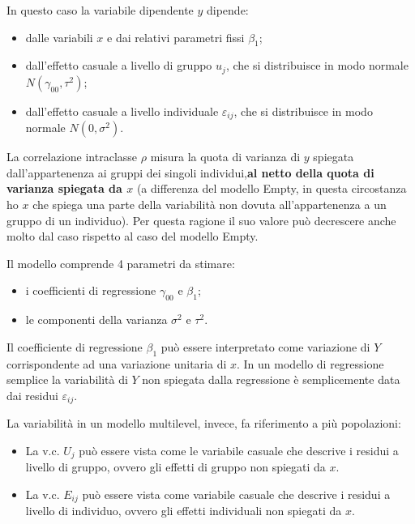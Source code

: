 \documentclass[a4page, 11pt]{article} %
\begin{document}
In questo caso la variabile dipendente $y$ dipende:
\begin{itemize}
\item dalle variabili $x$ e dai relativi parametri fissi $\beta_1$;
\item dall’effetto casuale a livello di gruppo $u_j$, che si distribuisce in modo normale  $N(\gamma_{00}, \tau^2)$;
\item dall’effetto casuale a livello individuale $\varepsilon_{ij}$, che si distribuisce in modo normale $N(0,\sigma^2)$.
\end{itemize}
La correlazione intraclasse $\rho$ misura la quota di varianza di $y$ spiegata dall’appartenenza ai gruppi dei singoli individui,\textbf{al netto della quota di varianza spiegata da $x$} (a differenza del modello Empty, in questa circostanza ho $x$ che spiega una parte della variabilità non dovuta all’appartenenza a un gruppo di un individuo). Per questa ragione il suo valore può decrescere anche molto dal caso rispetto al caso del modello Empty. 

Il modello comprende 4 parametri da stimare:
\begin{itemize}
\item i coefficienti di regressione $\gamma_{00}$ e $\beta_1$; \item le componenti della varianza $\sigma^{2}$ e $\tau^{2}$.
\end{itemize}
Il coefficiente di regressione $\beta_1$ può essere interpretato come variazione di $Y$ corrispondente ad una variazione unitaria di $x$. In un modello di regressione semplice la variabilità di $Y$ non spiegata dalla regressione è semplicemente data dai residui $\varepsilon_{ij}$.

La variabilità in un modello multilevel, invece, fa riferimento a più popolazioni:
\begin{itemize}
\item La v.c. $U_j$ può essere vista come le variabile casuale che descrive i residui a livello di gruppo, ovvero gli effetti di gruppo non spiegati da $x$.
\item La v.c. $E_{ij}$ può essere vista come variabile casuale che descrive i residui a livello di individuo, ovvero gli effetti individuali non spiegati da $x$.
\end{itemize}
\end{document}
